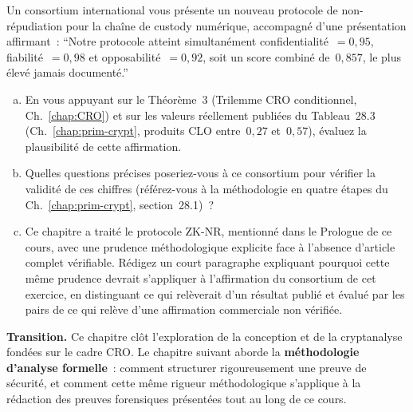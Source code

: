 \begin{boxexo}[title={\ding{45}\quad Exercice~30.3. Esprit critique face à un protocole en développement \niveauexpert}]
Un consortium international vous présente un nouveau protocole de
non-répudiation pour la chaîne de custody numérique, accompagné
d'une présentation affirmant~: ``Notre protocole atteint
simultanément confidentialité~$=0{,}95$, fiabilité~$=0{,}98$ et
opposabilité~$=0{,}92$, soit un score combiné de~$0{,}857$, le
plus élevé jamais documenté.''
\begin{enumerate}[(a)]
    \item En vous appuyant sur le Théorème~3 (Trilemme CRO
          conditionnel, Ch.~\ref{chap:CRO}) et sur les valeurs
          réellement publiées du Tableau~28.3 (Ch.~\ref{chap:prim-crypt},
          produits CLO entre~$0{,}27$ et~$0{,}57$), évaluez la
          plausibilité de cette affirmation.
    \item Quelles questions précises poseriez-vous à ce consortium
          pour vérifier la validité de ces chiffres (référez-vous
          à la méthodologie en quatre étapes du
          Ch.~\ref{chap:prim-crypt}, section~28.1)~?
    \item Ce chapitre a traité le protocole ZK-NR, mentionné dans
          le Prologue de ce cours, avec une prudence méthodologique
          explicite face à l'absence d'article complet vérifiable.
          Rédigez un court paragraphe expliquant pourquoi cette
          même prudence devrait s'appliquer à l'affirmation du
          consortium de cet exercice, en distinguant ce qui
          relèverait d'un résultat publié et évalué par les pairs
          de ce qui relève d'une affirmation commerciale non
          vérifiée.
\end{enumerate}
\end{boxexo}

\bigskip

\begin{boxinfo}
\textbf{Transition.} Ce chapitre clôt l'exploration de la
conception et de la cryptanalyse fondées sur le cadre CRO. Le
chapitre suivant aborde la \textbf{méthodologie d'analyse formelle}~:
comment structurer rigoureusement une preuve de sécurité, et
comment cette même rigueur méthodologique s'applique à la rédaction
des preuves forensiques présentées tout au long de ce cours.
\end{boxinfo}